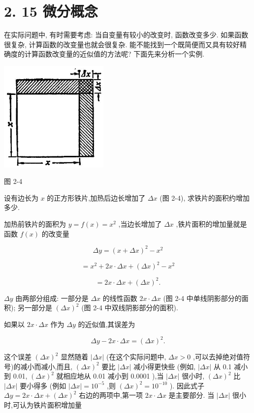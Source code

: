 \documentclass[10pt]{article}
\begin{document}
\section*{2. 15 微分概念}

在实际问题中, 有时需要考虑: 当自变量有较小的改变时, 函数改变多少. 如果函数很复杂, 计算函数的改变量也就会很复杂. 能不能找到一个既简便而又具有较好精确度的计算函数改变量的近似值的方法呢? 下面先来分析一个实例.

\begin{center}
\includegraphics[max width=0.4\textwidth]{images/01912c18-5c3f-733d-b775-749ba9897a9d_110_353714.jpg}
\end{center}

图 2-4

设有边长为 \(x\) 的正方形铁片,加热后边长增加了 \({\Delta x}\) (图 2-4), 求铁片的面积约增加多少.

加热前铁片的面积为 \(y = f\left( x\right) = {x}^{2}\) ,当边长增加了 \({\Delta x}\) ,铁片面积的增加量就是函数 \(f\left( x\right)\) 的改变量

\[
{\Delta y} = {\left( x + \Delta x\right) }^{2} - {x}^{2}
\]

\[
= {x}^{2} + {2x} \cdot {\Delta x} + {\left( \Delta x\right) }^{2} - {x}^{2}
\]

\[
= {2x} \cdot {\Delta x} + {\left( \Delta x\right) }^{2}\text{.} \tag{1}
\]

\({\Delta y}\) 由两部分组成: 一部分是 \({\Delta x}\) 的线性函数 \({2x} \cdot {\Delta x}\) (图 2-4 中单线阴影部分的面积); 另一部分是 \({\left( \Delta x\right) }^{2}\) (图 2-4 中双线阴影部分的面积).

如果以 \({2x} \cdot {\Delta x}\) 作为 \({\Delta y}\) 的近似值,其误差为

\[
{\Delta y} - {2x} \cdot {\Delta x} = {\left( \Delta x\right) }^{2}.
\]

这个误差 \({\left( \Delta x\right) }^{2}\) 显然随着 \(\left| {\Delta x}\right|\) (在这个实际问题中, \({\Delta x} > 0\) ,可以去掉绝对值符号)的减小而减小,而且, \({\left( \Delta x\right) }^{2}\) 要比 \(\left| {\Delta x}\right|\) 减小得更快些 (例如, \(\left| {\Delta x}\right|\) 从 0.1 减小到 0.01, \({\left( \Delta x\right) }^{2}\) 就相应地从 0.01 减小到 0.0001 ),当 \(\left| {\Delta x}\right|\) 很小时, \({\left( \Delta x\right) }^{2}\) 比 \(\left| {\Delta x}\right|\) 要小得多 (例如 \(\left| {\Delta x}\right| = {10}^{-5}\) ,则 \({\left( \Delta x\right) }^{2} = {10}^{-{10}}\) ). 因此式子 \({\Delta y} = {2x} \cdot {\Delta x} + {\left( \Delta x\right) }^{2}\) 右边的两项中,第一项 \({2x} \cdot {\Delta x}\) 是主要部分. 当 \(\left| {\Delta x}\right|\) 很小时,可认为铁片面积增加量
\end{document}
